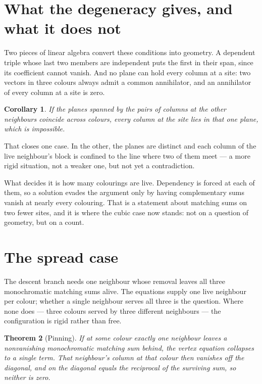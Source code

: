 \documentclass[11pt]{article}
\newtheorem{theorem}{Theorem}[section]
\newtheorem{corollary}[theorem]{Corollary}
\theoremstyle{definition}
\theoremstyle{remark}
\begin{document}
\section{What the degeneracy gives, and what it does not}\label{sec:sitelimit}

Two pieces of linear algebra convert these conditions into geometry. A dependent triple
whose last two members are independent puts the first in their span, since its coefficient
cannot vanish. And no plane can hold every column at a site: two vectors in three colours
always admit a common annihilator, and an annihilator of every column at a site is zero.

\begin{corollary}
If the planes spanned by the pairs of columns at the other neighbours coincide across
colours, every column at the site lies in that one plane, which is impossible.
\end{corollary}

That closes one case. In the other, the planes are distinct and each column of the live
neighbour's block is confined to the line where two of them meet --- a more rigid
situation, not a weaker one, but not yet a contradiction.

What decides it is how many colourings are live. Dependency is forced at each of them, so
a solution evades the argument only by having complementary sums vanish at nearly every
colouring. That is a statement about matching sums on two fewer sites, and it is where the
cubic case now stands: not on a question of geometry, but on a count.

\section{The spread case}\label{sec:spread}

The descent branch needs one neighbour whose removal leaves all three monochromatic
matching sums alive. The equations supply one live neighbour per colour; whether a single
neighbour serves all three is the question. Where none does --- three colours served by
three different neighbours --- the configuration is rigid rather than free.

\begin{theorem}[Pinning]
If at some colour exactly one neighbour leaves a nonvanishing monochromatic matching sum
behind, the vertex equation collapses to a single term. That neighbour's column at that
colour then vanishes off the diagonal, and on the diagonal equals the reciprocal of the
surviving sum, so neither is zero.
\end{theorem}
\end{document}
